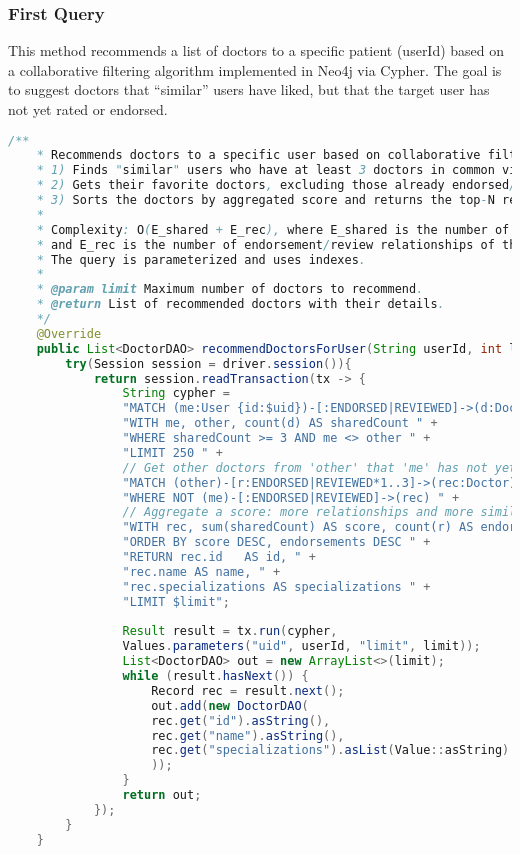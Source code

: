 \subsubsection{First Query}
This method recommends a list of doctors to a specific patient (userId) based on a collaborative filtering algorithm implemented in Neo4j via Cypher. The goal is to suggest doctors that “similar” users have liked, but that the target user has not yet rated or endorsed. 

\begin{lstlisting}[language=java]
	/**
	* Recommends doctors to a specific user based on collaborative filtering:
	* 1) Finds "similar" users who have at least 3 doctors in common via endorsement/review.
	* 2) Gets their favorite doctors, excluding those already endorsed/reviewed by the target user.
	* 3) Sorts the doctors by aggregated score and returns the top-N results.
	*
	* Complexity: O(E_shared + E_rec), where E_shared is the number of shared relationships
	* and E_rec is the number of endorsement/review relationships of the similar users.
	* The query is parameterized and uses indexes.
	*
	* @param limit Maximum number of doctors to recommend.
	* @return List of recommended doctors with their details.
	*/
	@Override
	public List<DoctorDAO> recommendDoctorsForUser(String userId, int limit){
		try(Session session = driver.session()){
			return session.readTransaction(tx -> {
				String cypher =
				"MATCH (me:User {id:$uid})-[:ENDORSED|REVIEWED]->(d:Doctor)<-[:ENDORSED|REVIEWED]-(other:User) " +
				"WITH me, other, count(d) AS sharedCount " +
				"WHERE sharedCount >= 3 AND me <> other " +
				"LIMIT 250 " +
				// Get other doctors from 'other' that 'me' has not yet endorsed/reviewed
				"MATCH (other)-[r:ENDORSED|REVIEWED*1..3]->(rec:Doctor) " +
				"WHERE NOT (me)-[:ENDORSED|REVIEWED]->(rec) " +
				// Aggregate a score: more relationships and more similar users increase the score
				"WITH rec, sum(sharedCount) AS score, count(r) AS endorsements " +
				"ORDER BY score DESC, endorsements DESC " +
				"RETURN rec.id   AS id, " +
				"rec.name AS name, " +
				"rec.specializations AS specializations " +
				"LIMIT $limit";
				
				Result result = tx.run(cypher,
				Values.parameters("uid", userId, "limit", limit));
				List<DoctorDAO> out = new ArrayList<>(limit);
				while (result.hasNext()) {
					Record rec = result.next();
					out.add(new DoctorDAO(
					rec.get("id").asString(),
					rec.get("name").asString(),
					rec.get("specializations").asList(Value::asString)
					));
				}
				return out;
			});
		}
	}
\end{lstlisting}

